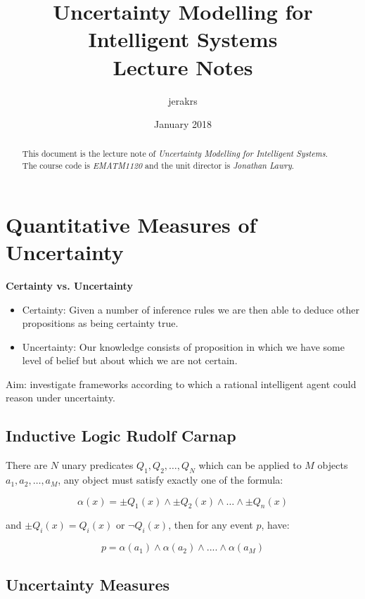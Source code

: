\documentclass{article}
\title{%
    Uncertainty Modelling for Intelligent Systems \\
    \vspace{0.4cm}
    \large Lecture Notes
}
\author{jerakrs}
\date{January 2018}
\begin{document}
\maketitle

\begin{abstract}
    This document is the lecture note of \textit{Uncertainty Modelling for Intelligent Systems}. The course code is \textit{EMATM1120} and the unit director is \textit{Jonathan Lawry}.
\end{abstract}


\section{Quantitative Measures of Uncertainty}

\textbf{Certainty vs. Uncertainty}

\begin{itemize}
    \item Certainty: Given a number of inference rules we are then able to deduce other propositions as being certainty true.
    \item Uncertainty: Our knowledge consists of proposition in which we have some level of belief but about which we are not certain.
\end{itemize}

Aim: investigate frameworks according to which a rational intelligent agent could reason under uncertainty.

\subsection{Inductive Logic Rudolf Carnap}

There are $N$ unary predicates $Q_1, Q_2, \dots, Q_N$ which can be applied to $M$ objects $a_1, a_2, \dots, a_M$, any object must satisfy exactly one of the formula:

\begin{equation}
    \alpha(x) = \pm Q_1(x) \wedge \pm Q_2(x) \wedge \dots \wedge \pm Q_n(x)
\end{equation}

and $\pm Q_i(x) = Q_i(x)$ or $\neg Q_i(x)$, then for any event $p$, have:

\begin{equation}
    p = \alpha(a_1) \wedge \alpha(a_2) \wedge .... \wedge \alpha(a_M)
\end{equation}


\subsection{Uncertainty Measures}
\end{document}
